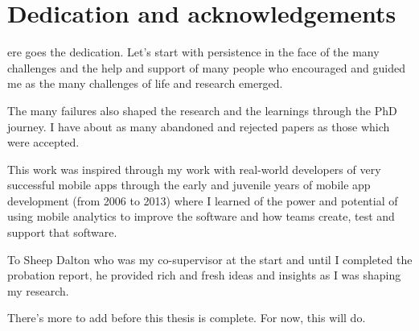 %
%

\chapter*{Dedication and acknowledgements}
\begin{SingleSpace}
ere goes the dedication. Let's start with persistence in the face of the many challenges and the help and support of many people who encouraged and guided me as the many challenges of life and research emerged.

The many failures also shaped the research and the learnings through the PhD journey. I have about as many abandoned and rejected papers as those which were accepted. 

This work was inspired through my work with real-world developers of very successful mobile apps through the early and juvenile years of mobile app development (from 2006 to 2013) where I learned of the power and potential of using mobile analytics to improve the software and how teams create, test and support that software.

To Sheep Dalton who was my co-supervisor at the start and until I completed the probation report, he  provided rich and fresh ideas and insights as I was shaping my research.

There's more to add before this thesis is complete. For now, this will do.
\end{SingleSpace}
\clearpage